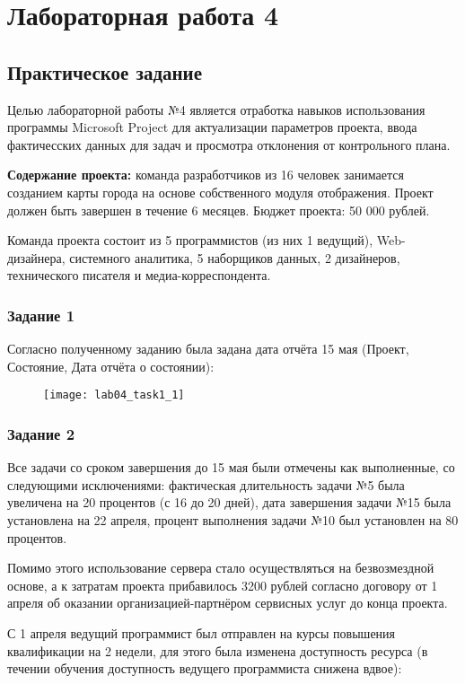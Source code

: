 \chapter{Лабораторная работа 4}
\section*{Практическое задание}

Целью лабораторной работы №4 является отработка навыков использования программы Microsoft Project для актуализации параметров проекта, ввода фактичесских данных для задач и просмотра отклонения от контрольного плана.

\textbf{Содержание проекта:} команда разработчиков из 16 человек занимается созданием карты города на основе собственного модуля отображения. Проект должен быть завершен в течение 6 месяцев. Бюджет проекта: 50 000 рублей.

Команда проекта состоит из 5 программистов (из них 1 ведущий), Web-дизайнера, системного аналитика, 5 наборщиков данных, 2 дизайнеров, технического писателя и медиа-корреспондента.

\subsection*{Задание 1}

Согласно полученному заданию была задана дата отчёта 15 мая (Проект, Состояние, Дата отчёта о состоянии):
\begin{figure}[h!]
	\texttt{[image: lab04\_task1\_1]}
\end{figure}


\subsection*{Задание 2}

Все задачи со сроком завершения до 15 мая были отмечены как выполненные, со следующими исключениями: фактическая длительность задачи №5 была увеличена на 20 процентов (с 16 до 20 дней), дата завершения задачи №15 была установлена на 22 апреля, процент выполнения задачи №10 был установлен на 80 процентов.

Помимо этого использование сервера стало осуществляться на безвозмездной основе, а к затратам проекта прибавилось 3200 рублей согласно договору от 1 апреля об оказании организацией-партнёром сервисных услуг до конца проекта.

С 1 апреля ведущий программист был отправлен на курсы повышения квалификации на 2 недели, для этого была изменена доступность ресурса (в течении обучения доступность ведущего программиста снижена вдвое):


